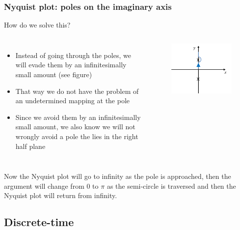 \begin{frame}
	\frametitle{Nyquist plot: poles on the imaginary axis}
	How do we solve this?
	\begin{columns}
		\begin{itemize}
			\item Instead of going through the poles, we will evade them by an infinitesimally small amount (see figure)
			\item That way we do not have the problem of an undetermined mapping at the pole
			\item Since we avoid them by an infinitesimally small amount, we also know we will not wrongly avoid a pole the lies in the right half plane
		\end{itemize}
		\begin{figure}
			\includegraphics[width=1\linewidth]{avoid_pole}
		\end{figure}
	\end{columns}
	Now the Nyquist plot will go to infinity as the pole is approached, then the argument will change from 0 to $\pi$ as the semi-circle is traversed and then the Nyquist plot will return from infinity.
\end{frame}

\subsection{Discrete-time}

